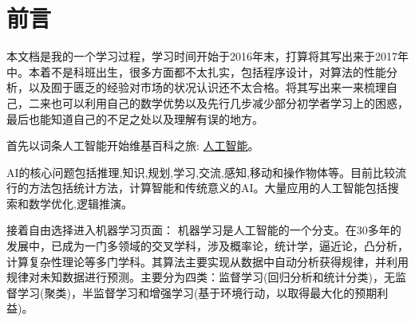 \chapter{前言}
\label{chap:preface}
本文档是我的一个学习过程，学习时间开始于2016年末，打算将其写出来于2017年中。本着不是科班出生，很多方面都不太扎实，包括程序设计，对算法的性能分析，以及囿于匮乏的经验对市场的状况认识还不太合格。将其写出来一来梳理自己，二来也可以利用自己的数学优势以及先行几步减少部分初学者学习上的困惑，最后也能知道自己的不足之处以及理解有误的地方。


首先以词条人工智能开始维基百科之旅:
\href{https://zh.wikipedia.org/wiki/%E4%BA%BA%E5%B7%A5%E6%99%BA%E8%83%BD}{人工智能}。

AI的核心问题包括推理,知识,规划,学习,交流,感知,移动和操作物体等。目前比较流行的方法包括统计方法，计算智能和传统意义的AI。大量应用的人工智能包括搜索和数学优化,逻辑推演。

接着自由选择进入机器学习页面：
机器学习是人工智能的一个分支。在30多年的发展中，已成为一门多领域的交叉学科，涉及概率论，统计学，逼近论，凸分析，计算复杂性理论等多门学科。其算法主要实现从数据中自动分析获得规律，并利用规律对未知数据进行预测。主要分为四类：监督学习(回归分析和统计分类)，无监督学习(聚类)，半监督学习和增强学习(基于环境行动，以取得最大化的预期利益)。

